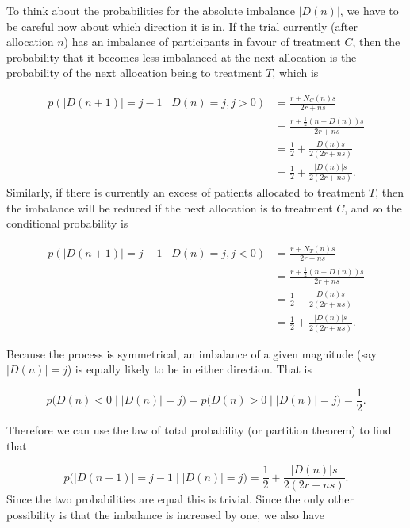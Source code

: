 \documentclass[
  openany]{book}
\theoremstyle{definition}
\theoremstyle{definition}
\theoremstyle{definition}
\theoremstyle{definition}
\theoremstyle{remark}
\begin{document}
To think about the probabilities for the absolute imbalance \(\lvert D\left(n\right)\rvert\), we have to be careful now about which direction it is in. If the trial currently (after allocation \(n\)) has an imbalance of participants in favour of treatment \(C\), then the probability that it becomes less imbalanced at the next allocation is the probability of the next allocation being to treatment \(T\), which is

\[
  \begin{aligned}
p\left(\lvert D\left(n+1\right)\rvert = j-1 \mid D\left(n\right)=j, j>0\right) & = \frac{r + N_C\left(n\right)s}{2r + ns} \\
& = \frac{r + \frac{1}{2}\left(n + D\left(n\right)\right)s}{2r + ns} \\
& = \frac{1}{2} + \frac{D\left(n\right)s}{2\left(2r + ns\right)} \\
& = \frac{1}{2} + \frac{\lvert D\left(n\right)\rvert s}{2\left(2r + ns\right)}.
\end{aligned}
\]
Similarly, if there is currently an excess of patients allocated to treatment \(T\), then the imbalance will be reduced if the next allocation is to treatment \(C\), and so the conditional probability is

\[
  \begin{aligned}
p\left(\lvert D\left(n+1\right)\rvert = j-1 \mid D\left(n\right)=j, j<0\right) & = \frac{r + N_T\left(n\right)s}{2r + ns} \\
& = \frac{r + \frac{1}{2}\left(n - D\left(n\right)\right)s}{2r + ns} \\
& = \frac{1}{2} - \frac{D\left(n\right)s}{2\left(2r + ns\right)}\\
& = \frac{1}{2} + \frac{\lvert D\left(n\right)\rvert s}{2\left(2r + ns\right)}.
\end{aligned}
\]

Because the process is symmetrical, an imbalance of a given magnitude (say \(\lvert D\left(n\right)\rvert=j\)) is equally likely to be in either direction. That is

\[p\big(D\left(n\right) < 0 \mid \lvert D\left(n\right)\rvert =j \big)= p\big(D\left(n\right) > 0 \mid \lvert D\left(n\right)\rvert =j \big) = \frac{1}{2}.\]

Therefore we can use the law of total probability (or partition theorem) to find that

\[
  p\big(\lvert D\left(n+1\right) \rvert = j-1 \mid \lvert D\left(n\right) \rvert = j \big) = \frac{1}{2}  + \frac{\lvert D\left(n\right)\rvert s}{2\left(2r + ns\right)}.
\]
Since the two probabilities are equal this is trivial. Since the only other possibility is that the imbalance is increased by one, we also have
\end{document}

